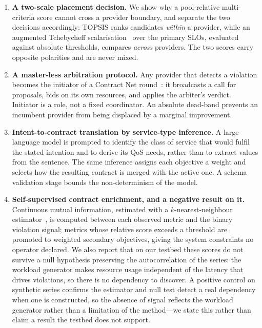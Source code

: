 \documentclass[conference]{IEEEtran}
\begin{document}
\begin{enumerate}
    \item \textbf{A two-scale placement decision.} We show why a
    pool-relative multi-criteria score cannot cross a provider boundary, and
    separate the two decisions accordingly: TOPSIS ranks candidates
    \emph{within} a provider, while an augmented Tchebycheff
    scalarisation~\cite{steuer1983} over the primary SLOs,
    evaluated against absolute thresholds, compares \emph{across} providers.
    The two scores carry opposite polarities and are never mixed.

    \item \textbf{A master-less arbitration protocol.} Any provider that
    detects a violation becomes the initiator of a Contract Net
    round~\cite{smith1980}: it broadcasts a call for proposals, bids on
    its own resources, and applies the arbiter's verdict. Initiator is a
    role, not a fixed coordinator. An absolute dead-band prevents an
    incumbent provider from being displaced by a marginal improvement.

    \item \textbf{Intent-to-contract translation by service-type inference.}
    A large language model is prompted to identify the class of service that
    would fulfil the stated intention and to derive its QoS needs, rather
    than to extract values from the sentence. The same inference assigns each
    objective a weight and selects how the resulting contract is merged with
    the active one. A schema validation stage bounds the non-determinism of
    the model.

    \item \textbf{Self-supervised contract enrichment, and a negative result
    on it.} Continuous mutual information, estimated with a
    $k$-nearest-neighbour estimator~\cite{kraskov2004}, is computed between
    each observed metric and the binary violation signal; metrics whose
    relative score exceeds a threshold are promoted to weighted secondary
    objectives, giving the system constraints no operator declared. We also
    report that on our testbed these scores do not survive a null hypothesis
    preserving the autocorrelation of the series: the workload generator
    makes resource usage independent of the latency that drives violations,
    so there is no dependency to discover. A positive control on synthetic
    series confirms the estimator and null test detect a real dependency
    when one is constructed, so the absence of signal reflects the workload
    generator rather than a limitation of the method---we state this
    rather than claim a result the testbed does not support.


\end{enumerate}
\end{document}
